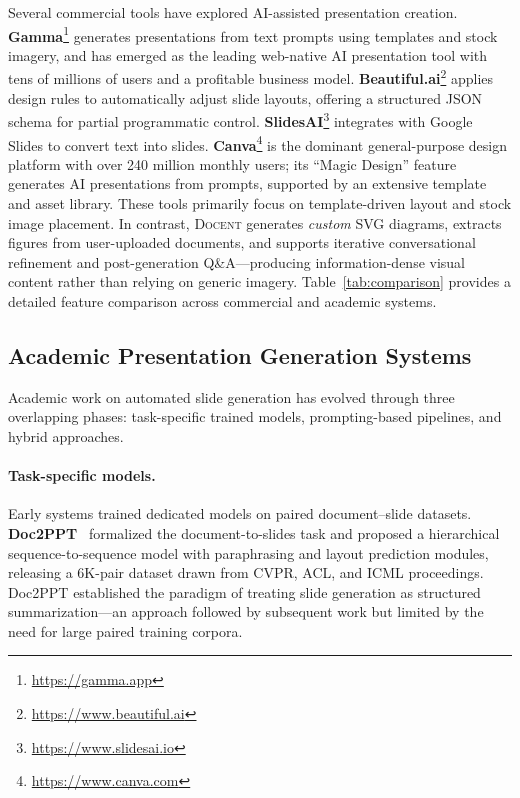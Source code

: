 \documentclass[11pt,a4paper]{article}
\newcommand{\system}{\textsc{Docent}\xspace}
\begin{document}
Several commercial tools have explored AI-assisted presentation creation.
\textbf{Gamma}\footnote{\url{https://gamma.app}} generates presentations from text prompts using templates and stock imagery, and has emerged as the leading web-native AI presentation tool with tens of millions of users and a profitable business model.
\textbf{Beautiful.ai}\footnote{\url{https://www.beautiful.ai}} applies design rules to automatically adjust slide layouts, offering a structured JSON schema for partial programmatic control.
\textbf{SlidesAI}\footnote{\url{https://www.slidesai.io}} integrates with Google Slides to convert text into slides.
\textbf{Canva}\footnote{\url{https://www.canva.com}} is the dominant general-purpose design platform with over 240 million monthly users; its ``Magic Design'' feature generates AI presentations from prompts, supported by an extensive template and asset library.
These tools primarily focus on template-driven layout and stock image placement.
In contrast, \system generates \emph{custom} SVG diagrams, extracts figures from user-uploaded documents, and supports iterative conversational refinement and post-generation Q\&A---producing information-dense visual content rather than relying on generic imagery.
Table~\ref{tab:comparison} provides a detailed feature comparison across commercial and academic systems.

\subsection{Academic Presentation Generation Systems}

Academic work on automated slide generation has evolved through three overlapping phases: task-specific trained models, prompting-based pipelines, and hybrid approaches.

\paragraph{Task-specific models.}
Early systems trained dedicated models on paired document--slide datasets.
\textbf{Doc2PPT}~\citep{fu2022doc2ppt} formalized the document-to-slides task and proposed a hierarchical sequence-to-sequence model with paraphrasing and layout prediction modules, releasing a 6K-pair dataset drawn from CVPR, ACL, and ICML proceedings.
Doc2PPT established the paradigm of treating slide generation as structured summarization---an approach followed by subsequent work but limited by the need for large paired training corpora.
\end{document}
